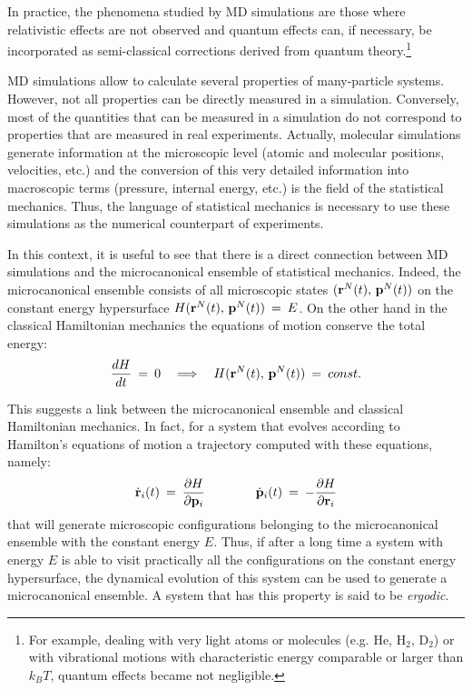 In practice, the phenomena studied by MD simulations are those where relativistic effects are not observed and quantum effects can, if necessary, be incorporated as semi-classical corrections derived from quantum theory.\footnote{For example, dealing with very light atoms or molecules (e.g. He, H$_2$, D$_2$) or with vibrational motions with characteristic energy comparable or larger than $k_B T$, quantum effects became not negligible.}

MD simulations allow to calculate several properties of many-particle systems. However, not all properties can be directly measured in a simulation. Conversely, most of the quantities that can be measured in a simulation do not correspond to properties that are measured in real experiments.
Actually, molecular simulations generate information at the microscopic level (atomic and molecular positions, velocities, etc.) and the conversion of this very detailed information into macroscopic terms (pressure, internal energy, etc.) is the field of the statistical mechanics. Thus, the language of statistical mechanics is necessary to use these simulations as the numerical counterpart of experiments.

In this context, it is useful to see that there is a direct connection between MD simulations and the microcanonical ensemble of statistical mechanics. Indeed, the microcanonical ensemble consists of all microscopic states $( \bold{r}^N(t), \, \bold{p}^N(t) )$  on the constant energy hypersurface $H (\bold{r}^N(t) , \, \bold{p}^N(t)) \:=\: E$.
On the other hand in the classical Hamiltonian mechanics the equations of motion conserve the total energy: 
\begin{equation}\label{eq:hamilton-energy_cons}
\frac{dH}{dt} \:=\: 0 \quad \Longrightarrow \quad H ( \bold{r}^N(t), \, \bold{p}^N(t) ) \:=\: const.
\end{equation}

This suggests a link between the microcanonical ensemble and classical Hamiltonian mechanics. In fact, for a system that evolves according to Hamilton's equations of motion a trajectory computed with these equations, namely:
\begin{equation}\label{eq:hamilton}
\dot{\bold{r}}_i(t) \:=\: \frac{\partial H}{\partial \bold{p}_i} \qquad \qquad \dot{\bold{p}}_i(t) \:=\: - \frac{\partial H}{\partial \bold{r}_i}
\end{equation}
that will generate microscopic configurations belonging to the microcanonical ensemble with the constant energy $E$. Thus, if after a long time a system with energy $E$ is able to visit practically all the configurations on the constant energy hypersurface, the dynamical evolution of this system can be used to generate a microcanonical ensemble. A system that has this property is said to be \textit{ergodic}.


